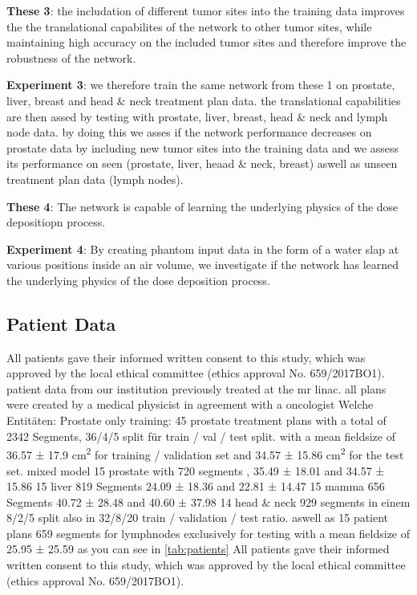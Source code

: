 \begin{hangingpar}
    \item\textbf{These 3}: the includation of different tumor sites into the training data improves the the translational capabilites of the network to other tumor sites, while maintaining high accuracy on the included tumor sites and therefore improve the robustness of the network.
    \item\textbf{Experiment 3}: we therefore train the same network from these 1 on prostate, liver, breast and head \& neck treatment plan data. the translational capabilities are then assed by testing with prostate, liver, breast, head \& neck and lymph node data. by doing this we asses if the network performance decreases on prostate data by including new tumor sites into the training data and we assess its performance on seen (prostate, liver, heaad \& neck, breast) aswell as unseen treatment plan data (lymph nodes).
\end{hangingpar}

\begin{hangingpar}
    \item\textbf{These 4}: The network is capable of learning the underlying physics of the dose depositiopn process. 
    \item\textbf{Experiment 4}: By creating phantom input data in the form of a water slap at various positions inside an air volume, we investigate if the network has learned the underlying physics of the dose deposition process.
\end{hangingpar}

\subsection{Patient Data}
All patients gave their informed written consent to this study, which was approved by the local ethical committee (ethics approval No. 659/2017BO1).
patient data from our institution previously treated at the mr linac. all plans were created by a medical physicist in agreement with a oncologist
Welche Entitäten: Prostate only training: 45 prostate treatment plans with a total of 2342 Segments, 36/4/5 split für train / val / test split. with a mean fieldsize of 36.57 ± 17.9 cm\textsuperscript{2} for training / validation set and 34.57 ± 15.86 cm\textsuperscript{2} for the test set.
mixed model 15 prostate with 720 segments , 35.49 ± 18.01 and 34.57 ± 15.86 15 liver 819 Segments 24.09 ± 18.36 and 22.81 ± 14.47 15 mamma 656 Segments 40.72 ± 28.48 and 40.60 ± 37.98 14 head \& neck 929 segments in einem 8/2/5 split also in 32/8/20 train / validation / test ratio. aswell as 15 patient plans 659 segments for lymphnodes exclusively for testing with a mean fieldsize of 25.95 ± 25.59
as you can see in \autoref{tab:patients}
All patients gave their informed written consent to this study, which was approved by the local ethical committee (ethics approval No. 659/2017BO1).


